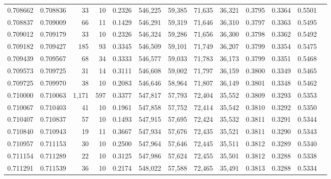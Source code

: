 \begin{tabular}{rrrrrrrrrrrrr}
0.708662 & 0.708836 &    33 &  10 &                                     0.2326 & 546,225 &  59,385 &  71,635 &  36,321 & 0.3795 & 0.3364 & 0.5501 \\
0.708837 & 0.709009 &    66 &  11 &                                     0.1429 & 546,291 &  59,319 &  71,646 &  36,310 & 0.3797 & 0.3363 & 0.5495 \\
0.709012 & 0.709179 &    33 &  10 &                                     0.2326 & 546,324 &  59,286 &  71,656 &  36,300 & 0.3798 & 0.3362 & 0.5492 \\
0.709182 & 0.709427 &   185 &  93 &                                     0.3345 & 546,509 &  59,101 &  71,749 &  36,207 & 0.3799 & 0.3354 & 0.5475 \\
0.709439 & 0.709567 &    68 &  34 &                                     0.3333 & 546,577 &  59,033 &  71,783 &  36,173 & 0.3799 & 0.3351 & 0.5468 \\
0.709573 & 0.709725 &    31 &  14 &                                     0.3111 & 546,608 &  59,002 &  71,797 &  36,159 & 0.3800 & 0.3349 & 0.5465 \\
0.709725 & 0.709970 &    38 &  10 &                                     0.2083 & 546,646 &  58,964 &  71,807 &  36,149 & 0.3801 & 0.3348 & 0.5462 \\
0.710000 & 0.710063 & 1,171 & 597 &                                     0.3377 & 547,817 &  57,793 &  72,404 &  35,552 & 0.3809 & 0.3293 & 0.5353 \\
0.710067 & 0.710403 &    41 &  10 &                                     0.1961 & 547,858 &  57,752 &  72,414 &  35,542 & 0.3810 & 0.3292 & 0.5350 \\
0.710407 & 0.710837 &    57 &  10 &                                     0.1493 & 547,915 &  57,695 &  72,424 &  35,532 & 0.3811 & 0.3291 & 0.5344 \\
0.710840 & 0.710943 &    19 &  11 &                                     0.3667 & 547,934 &  57,676 &  72,435 &  35,521 & 0.3811 & 0.3290 & 0.5343 \\
0.710957 & 0.711153 &    30 &  10 &                                     0.2500 & 547,964 &  57,646 &  72,445 &  35,511 & 0.3812 & 0.3289 & 0.5340 \\
0.711154 & 0.711289 &    22 &  10 &                                     0.3125 & 547,986 &  57,624 &  72,455 &  35,501 & 0.3812 & 0.3288 & 0.5338 \\
0.711291 & 0.711539 &    36 &  10 &                                     0.2174 & 548,022 &  57,588 &  72,465 &  35,491 & 0.3813 & 0.3288 & 0.5334 \\

\end{tabular}
